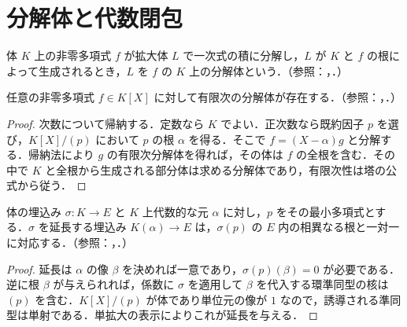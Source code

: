 \section{分解体と代数閉包}
\begin{defn}[分解体]
体 $K$ 上の非零多項式 $f$ が拡大体 $L$ で一次式の積に分解し，$L$ が $K$ と $f$ の根によって生成されるとき，$L$ を $f$ の $K$ 上の分解体という．（参照：，．）
\end{defn}
\begin{prop}[分解体の存在]
任意の非零多項式 $f\in K[X]$ に対して有限次の分解体が存在する．（参照：，．）
\end{prop}
\begin{proof}
次数について帰納する．定数なら $K$ でよい．正次数なら既約因子 $p$ を選び，$K[X]/(p)$ において $p$ の根 $\alpha$ を得る．そこで $f=(X-\alpha)g$ と分解する．帰納法により $g$ の有限次分解体を得れば，その体は $f$ の全根を含む．その中で $K$ と全根から生成される部分体は求める分解体であり，有限次性は塔の公式から従う．
\end{proof}
\begin{prop}[単拡大からの埋込みの延長]
体の埋込み $\sigma:K\to E$ と $K$ 上代数的な元 $\alpha$ に対し，$p$ をその最小多項式とする．$\sigma$ を延長する埋込み $K(\alpha)\to E$ は，$\sigma(p)$ の $E$ 内の相異なる根と一対一に対応する．（参照：，．）
\end{prop}
\begin{proof}
延長は $\alpha$ の像 $\beta$ を決めれば一意であり，$\sigma(p)(\beta)=0$ が必要である．逆に根 $\beta$ が与えられれば，係数に $\sigma$ を適用して $\beta$ を代入する環準同型の核は $(p)$ を含む．$K[X]/(p)$ が体であり単位元の像が $1$ なので，誘導される準同型は単射である．単拡大の表示によりこれが延長を与える．
\end{proof}

